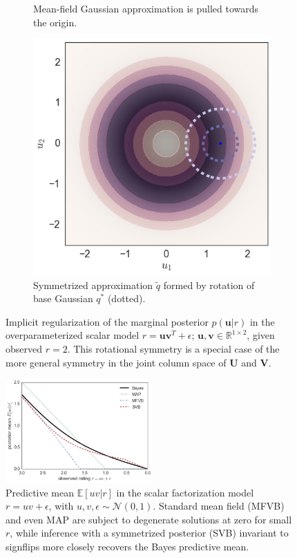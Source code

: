 \documentclass{article}
\newcommand{\N}{\mathcal{N}}
\newcommand{\E}{\mathbb{E}}
\renewcommand{\v}[1]{\mathbf{#1}}
\begin{document}
\begin{figure}[t]
\begin{subfigure}[t]{.3\textwidth}
\caption{Mean-field Gaussian approximation is pulled towards the origin.}
\end{subfigure}
\begin{subfigure}[t]{.3\textwidth}
\includegraphics[width=\textwidth]{rot_symmetric_posterior}
\caption{Symmetrized approximation $\tilde{q}$ formed by rotation
  of base Gaussian $q^*$ (dotted).}
\end{subfigure}
\caption{Implicit regularization of the marginal posterior $p(\v{u} | r)$ in the
  overparameterized scalar model $r = \v{u}\v{v}^T + \epsilon$;
  $\v{u},\v{v} \in \mathbb{R}^{1 \times 2}$, given observed
  $r=2$. This rotational symmetry is a special case of the more general
  symmetry in the joint column space of $\v{U}$ and $\v{V}$.}
\label{fig:rot_demo}
\vspace{-1.3em}
\end{figure}

\begin{figure}
\centering
\includegraphics[width=0.5\textwidth]{signflip_sv_plot}
\caption{Predictive mean $\E[uv | r]$ in the scalar factorization model $r = uv + \epsilon$, with $u,
  v, \epsilon \sim \N(0, 1)$. Standard mean field (MFVB)
  and even MAP are subject to degenerate solutions at zero for small $r$, while
  inference with a symmetrized posterior (SVB) invariant to signflips
  more closely recovers the Bayes predictive mean.}
\label{fig:signflip_svs}
\end{figure}
\end{document}

